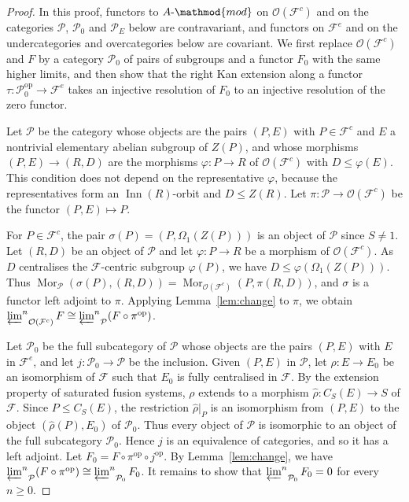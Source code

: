\documentclass[10pt]{amsart}
\theoremstyle{definition}
\DeclareMathOperator{\Mor}{Mor}
\numberwithin{equation}{section}
\renewcommand{\le}{\leqslant}
\renewcommand{\ge}{\geqslant}
\newcommand{\F}{\mathcal F}
\newcommand{\Op}{\mathcal O}
\newcommand{\Inn}{\operatorname{Inn}}
\newcommand{\limi}[2]{\mathop{\varprojlim\nolimits^{#1}}_{#2}}
\begin{document}
\begin{proof}
In this proof, functors to $A\text{-}\mathmod{mod}$ on $\Op(\F^c)$ and on the categories $\mathcal P$, $\mathcal P_0$ and $\mathcal P_E$ below are contravariant, and functors on $\F^e$ and on the undercategories and overcategories below are covariant. We first replace $\Op(\F^c)$ and $F$ by a category $\mathcal P_0$ of pairs of subgroups and a functor $F_0$ with the same higher limits, and then show that the right Kan extension along a functor $\tau\colon\mathcal P_0^{\mathrm{op}}\to\F^e$ takes an injective resolution of $F_0$ to an injective resolution of the zero functor.

Let $\mathcal P$ be the category whose objects are the pairs $(P,E)$ with $P\in\F^c$ and $E$ a nontrivial elementary abelian subgroup of $Z(P)$, and whose morphisms $(P,E)\to(R,D)$ are the morphisms $\varphi\colon P\to R$ of $\Op(\F^c)$ with $D\le\varphi(E)$. This condition does not depend on the representative $\varphi$, because the representatives form an $\Inn(R)$-orbit and $D\le Z(R)$. Let $\pi\colon\mathcal P\to\Op(\F^c)$ be the functor $(P,E)\mapsto P$.

For $P\in\F^c$, the pair $\sigma(P)=(P,\Omega_1(Z(P)))$ is an object of $\mathcal P$ since $S\ne1$. Let $(R,D)$ be an object of $\mathcal P$ and let $\varphi\colon P\to R$ be a morphism of $\Op(\F^c)$. As $D$ centralises the $\F$-centric subgroup $\varphi(P)$, we have $D\le\varphi(\Omega_1(Z(P)))$. Thus $\Mor_{\mathcal P}(\sigma(P),(R,D))=\Mor_{\Op(\F^c)}(P,\pi(R,D))$, and $\sigma$ is a functor left adjoint to $\pi$. Applying Lemma~\ref{lem:change} to $\pi$, we obtain $\limi{n}{\Op(\F^c)}F\cong\limi{n}{\mathcal P}(F\circ\pi^{\mathrm{op}})$.

Let $\mathcal P_0$ be the full subcategory of $\mathcal P$ whose objects are the pairs $(P,E)$ with $E$ in $\F^e$, and let $j\colon\mathcal P_0\to\mathcal P$ be the inclusion. Given $(P,E)$ in $\mathcal P$, let $\rho\colon E\to E_0$ be an isomorphism of $\F$ such that $E_0$ is fully centralised in $\F$. By the extension property of saturated fusion systems, $\rho$ extends to a morphism $\widehat\rho\colon C_S(E)\to S$ of $\F$. Since $P\le C_S(E)$, the restriction $\widehat\rho|_P$ is an isomorphism from $(P,E)$ to the object $(\widehat\rho(P),E_0)$ of $\mathcal P_0$. Thus every object of $\mathcal P$ is isomorphic to an object of the full subcategory $\mathcal P_0$. Hence $j$ is an equivalence of categories, and so it has a left adjoint. Let $F_0=F\circ\pi^{\mathrm{op}}\circ j^{\mathrm{op}}$. By Lemma~\ref{lem:change}, we have $\limi{n}{\mathcal P}(F\circ\pi^{\mathrm{op}})\cong\limi{n}{\mathcal P_0}F_0$. It remains to show that $\limi{n}{\mathcal P_0}F_0=0$ for every $n\ge0$.


\end{proof}
\end{document}
